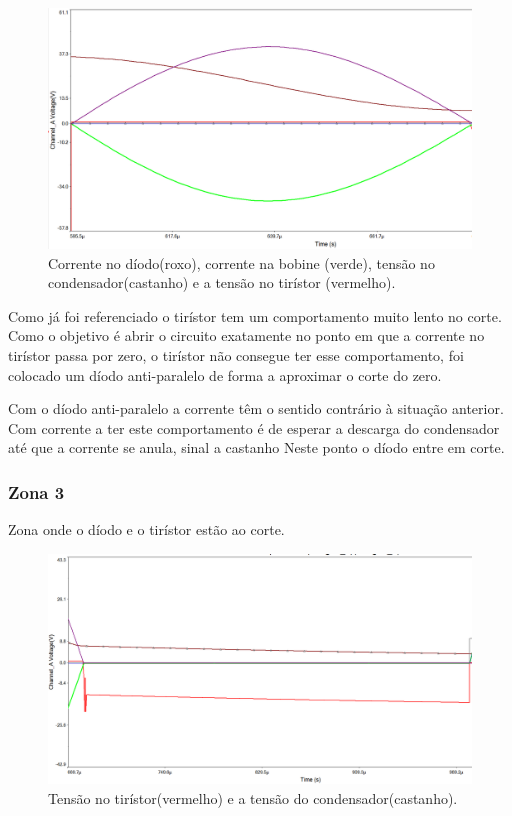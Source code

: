 \documentclass[a4paper,11pt]{article}
\numberwithin{equation}{section}
\begin{document}
	\begin{figure}[h]
		\centering
		\includegraphics[keepaspectratio=true, scale=0.4]{img/Zona2}
		\caption{Corrente no díodo(roxo), corrente na bobine (verde), tensão no condensador(castanho) e a tensão no tirístor (vermelho).}
		\label{fig:figura 2}
		\vspace{-0.8em}
	\end{figure}
	
	Como já  foi referenciado o tirístor tem um comportamento muito lento no corte. Como o objetivo é abrir o circuito exatamente no ponto em que a corrente no tirístor passa por zero, o tirístor não consegue ter esse comportamento, foi colocado um díodo anti-paralelo de forma a aproximar o corte do zero.    
	
	Com o díodo anti-paralelo a corrente têm o sentido contrário à situação anterior. Com corrente a ter este comportamento é de esperar a descarga do condensador até que a corrente se anula, sinal a castanho Neste ponto o díodo entre em corte.

	
\subsubsection*{Zona 3}
	Zona onde o díodo e o tirístor estão ao corte.
	
	\begin{figure}[h]
		\centering
		\includegraphics[keepaspectratio=true, scale=0.4]{img/Zona3}
		\caption{Tensão no tirístor(vermelho) e a tensão do condensador(castanho).}
		\label{fig:figura 3}
		\vspace{-0.8em}
	\end{figure}
	
\end{document}
